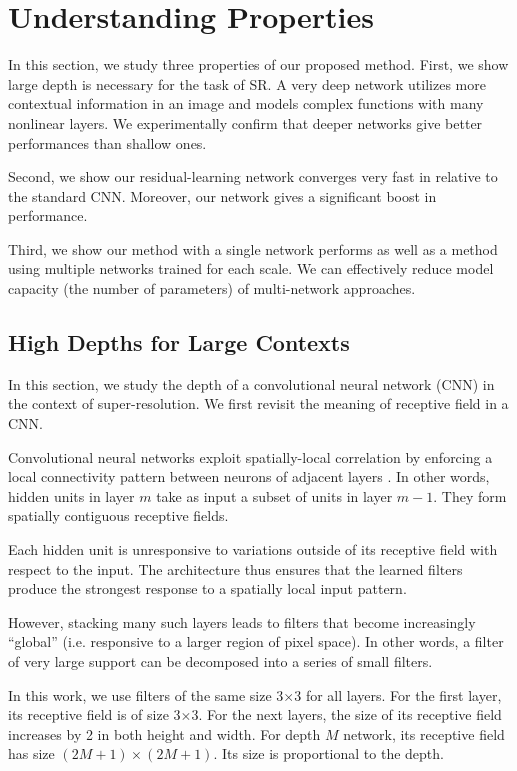 \documentclass[10pt,twocolumn,letterpaper]{article}
\begin{document}
\section{Understanding Properties}

In this section, we study three properties of our proposed method. First, we show large depth is necessary for the task of SR. A very deep network utilizes more contextual information in an image and models complex functions with many nonlinear layers. We experimentally confirm that deeper networks give better performances than shallow ones. 

Second, we show our residual-learning network converges very fast in relative to the standard CNN. Moreover, our network gives a significant boost in performance. 

Third, we show our method with a single network performs as well as a method using multiple networks trained for each scale. We can effectively reduce model capacity (the number of parameters) of multi-network approaches.


\subsection{High Depths for Large Contexts}
In this section, we study the depth of a convolutional neural network (CNN) in the context of super-resolution. We first revisit the meaning of receptive field in a CNN. 

Convolutional neural networks exploit spatially-local correlation by enforcing a local connectivity pattern between neurons of adjacent layers \cite{Bengio-et-al-2015-Book}. In other words, hidden units in layer $m$ take as input a subset of units in layer $m-1$. They form spatially contiguous receptive fields.

Each hidden unit is unresponsive to variations outside of its receptive field with respect to the input. The architecture thus ensures that the learned filters produce the strongest response to a spatially local input pattern.

However, stacking many such layers leads to filters that become increasingly “global” (i.e. responsive to a larger region of pixel space). In other words, a filter of very large support can be decomposed into a series of small filters. 

In this work, we use filters of the same size 3$\times$3 for all layers. For the first layer, its receptive field is of size 3$\times$3. For the next layers, the size of its receptive field increases by 2 in both height and width. For depth $M$ network, its receptive field has size $(2M+1)\times(2M+1)$. Its size is proportional to the depth.
\end{document}
